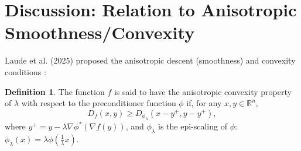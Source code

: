 \documentclass{article}
\theoremstyle{plain}
\theoremstyle{definition}
\newtheorem{definition}[theorem]{Definition}
\theoremstyle{remark}
\begin{document}



\newpage
\appendix


\section{Discussion: Relation to Anisotropic Smoothness/Convexity} 
\label{sec:anisotropic}

Laude et al. (2025) proposed the anisotropic descent (smoothness) and convexity conditions \cite{laude2025anisotropic}:

\begin{definition}\label{def:anisoconvex}
    The function $f$ is said to have the anisotropic convexity property of $\lambda$ with respect to the preconditioner function $\phi$ if, for any $x,y\in\mathbb{R}^n$, 
    \begin{equation}
    D_f(x,y)\geq D_{\phi_{\lambda}}(x-y^+,y-y^+),
    \end{equation}
    where $y^+ = y-\lambda\nabla \phi^*(\nabla f(y))$, and $\phi_{\lambda}$ is the epi-scaling of $\phi$: $\phi_{\lambda}(x) = \lambda\phi(\frac{1}{\lambda}x)$.
\end{definition}
\end{document}
